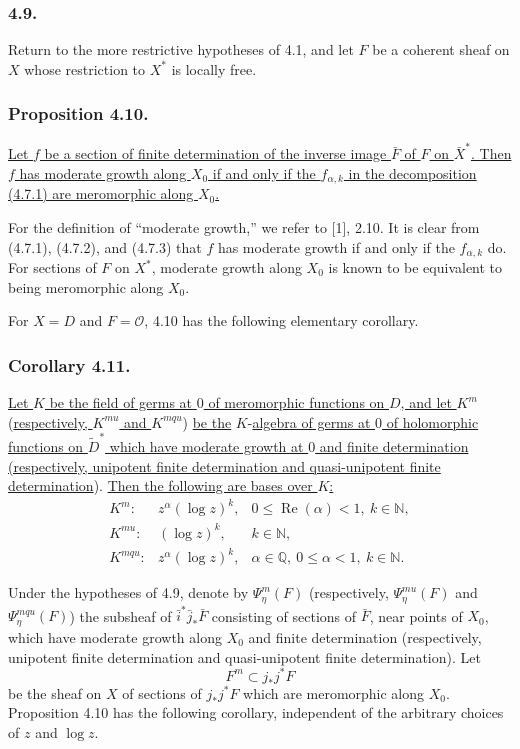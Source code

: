 \subsubsection*{4.9.}
Return to the more restrictive hypotheses of 4.1, and let $F$ be a
coherent sheaf on $X$ whose restriction to $X^*$ is locally free.

\subsubsection*{Proposition 4.10.}
\underline{Let $f$ be a section of finite determination of the inverse
image $\bar F$ of $F$ on $\bar X^*$.  Then $f$ has moderate growth
along $X_0$ if and only if the $f_{\alpha,k}$ in the decomposition
(4.7.1) are meromorphic along $X_0$.}

For the definition of ``moderate growth,'' we refer to [1], 2.10.  It
is clear from (4.7.1), (4.7.2), and (4.7.3) that $f$ has moderate
growth if and only if the $f_{\alpha,k}$ do.  For sections of $F$ on
$X^*$, moderate growth along $X_0$ is known to be equivalent to being
meromorphic along $X_0$.

For $X=D$ and $F=\mathcal O$, 4.10 has the following elementary
corollary.

\subsubsection*{Corollary 4.11.}
\underline{Let $K$ be the field of germs at $0$ of meromorphic
functions on $D$, and let $K^m$} (\underline{respectively, $K^{mu}$ and $K^{mqu}$})
\underline{be the} $K$-\underline{algebra of germs at $0$ of holomorphic functions on
$\widetilde D^*$ which have moderate growth at $0$ and finite
determination (respectively, unipotent finite determination and
quasi-unipotent finite determination}).  \underline{Then the following are bases
over $K$:}
\[
\begin{array}{lll}
K^m:&z^\alpha(\log z)^k,
  &0\leq\operatorname{Re}(\alpha)<1,\ k\in\mathbb N,\\[2pt]
K^{mu}:&(\log z)^k,&k\in\mathbb N,\\[2pt]
K^{mqu}:&z^\alpha(\log z)^k,
  &\alpha\in\mathbb Q,\ 0\leq\alpha<1,\ k\in\mathbb N.
\end{array}
\]

Under the hypotheses of 4.9, denote by $\Psi_\eta^m(F)$
(respectively, $\Psi_\eta^{mu}(F)$ and $\Psi_\eta^{mqu}(F)$) the
subsheaf of $\bar i^*\bar j_*\bar F$ consisting of sections of
$\bar F$, near points of $X_0$, which have moderate growth along
$X_0$ and finite determination (respectively, unipotent finite
determination and quasi-unipotent finite determination).  Let
\[
F^m\subset j_*j^*F
\]
be the sheaf on $X$ of sections of $j_*j^*F$ which are meromorphic
along $X_0$.  Proposition 4.10 has the following corollary, independent
of the arbitrary choices of $z$ and $\log z$.

